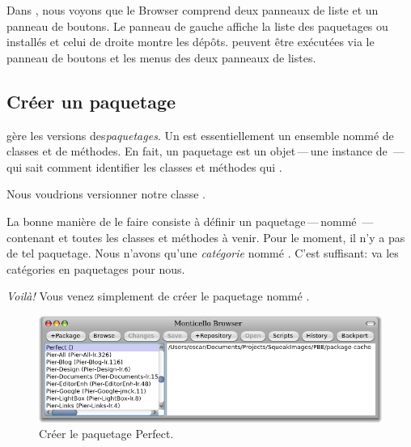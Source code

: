 \documentclass[a4paper,10pt,twoside]{book}
\begin{document}
Dans , nous voyons que le \MC Browser 
comprend deux panneaux de liste et un panneau de boutons. Le panneau
de gauche affiche la liste des paquetages ou  installés
et celui de droite montre les dépôts.
 peuvent être exécutées via le panneau de
boutons et les menus des deux panneaux de listes. %

\subsection{Créer un paquetage}

\MC gère les versions des\emph{paquetages}.  Un  est
essentiellement un ensemble nommé de classes et de méthodes.
En fait, un paquetage est un objet\,---\,une instance de
\,---\,qui sait comment identifier les classes et
méthodes qui .

Nous voudrions versionner notre classe .

La bonne manière de le faire consiste à définir un
paquetage\,---\,nommé \,---\,contenant
 et toutes les classes et méthodes à venir. Pour le
moment, il n'y a pas de tel paquetage. Nous n'avons qu'une
\emph{catégorie} nommé %
. %
C'est suffisant: \MC va  les catégories en
paquetages pour nous.


\emph{Voil\`a!} Vous venez simplement de créer le paquetage \MC nommé . 

\begin{figure}[ht]\centering
	\includegraphics[width=\textwidth]{perfectPackage}
	\caption{Créer le paquetage Perfect.}
\end{figure}
\end{document}
